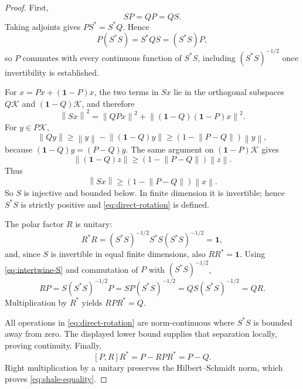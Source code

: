 \documentclass[11pt]{article}
\theoremstyle{remark}
\newcommand{\id}{\mathbf 1}
\newcommand{\K}{\mathcal K}
\newcommand{\norm}[1]{\left\lVert #1\right\rVert}
\begin{document}
\begin{proof}
First,
\[
 SP=QP=QS.
\tag{3.4}\label{eq:intertwine-S}
\]
Taking adjoints gives $PS^*=S^*Q$.  Hence
\[
 P(S^*S)=S^*QS=(S^*S)P,
\]
so $P$ commutes with every continuous function of $S^*S$, including
$(S^*S)^{-1/2}$ once invertibility is established.

For $x=Px+(\id-P)x$, the two terms in $Sx$ lie in the orthogonal
subspaces $Q\K$ and $(\id-Q)\K$, and therefore
\[
 \norm{Sx}^2
 =\norm{QPx}^2+\norm{(\id-Q)(\id-P)x}^2.
\]
For $y\in P\K$,
\[
 \norm{Qy}\ge \norm{y}-\norm{(\id-Q)y}
 \ge (1-\norm{P-Q})\norm{y},
\]
because $(\id-Q)y=(P-Q)y$.  The same argument on $(\id-P)\K$ gives
\[
 \norm{(\id-Q)z}\ge(1-\norm{P-Q})\norm{z}.
\]
Thus
\[
 \norm{Sx}\ge(1-\norm{P-Q})\norm{x}.
\]
So $S$ is injective and bounded below.  In finite dimension it is
invertible; hence $S^*S$ is strictly positive and
\eqref{eq:direct-rotation} is defined.

The polar factor $R$ is unitary:
\[
 R^*R=(S^*S)^{-1/2}S^*S(S^*S)^{-1/2}=\id,
\]
and, since $S$ is invertible in equal finite dimensions, also $RR^*=\id$.
Using \eqref{eq:intertwine-S} and commutation of $P$ with
$(S^*S)^{-1/2}$,
\[
 RP=S(S^*S)^{-1/2}P
 =SP(S^*S)^{-1/2}
 =QS(S^*S)^{-1/2}=QR.
\]
Multiplication by $R^*$ yields $RPR^*=Q$.

All operations in \eqref{eq:direct-rotation} are norm-continuous where
$S^*S$ is bounded away from zero.  The displayed lower bound supplies
that separation locally, proving continuity.  Finally,
\[
 [P,R]R^*=P-RPR^*=P-Q.
\]
Right multiplication by a unitary preserves the Hilbert--Schmidt norm,
which proves \eqref{eq:shale-equality}.
\end{proof}
\end{document}
